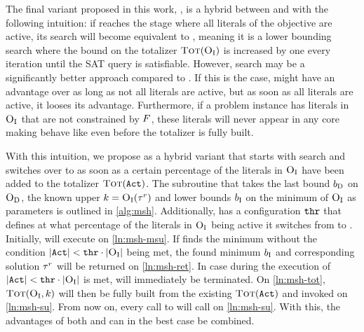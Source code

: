 The final variant proposed in this work, \msh{}, is a hybrid between \msu{} and \satunsat{} with the following intuition:
if \msu{}  reaches the stage where all literals of the objective are active, its search will become equivalent to \unsatsat{}, meaning it is a lower bounding search where the bound on the totalizer $\textsc{Tot}(\textsc{O}_{\text{I}})$ is increased by one every iteration until the SAT query is satisfiable.
However, \satunsat{} search may be a significantly better approach compared to \unsatsat{}.
If this is the case, \msu{} might have an advantage over \satunsat{} as long as not all literals are active, but as soon as all literals are active, it looses its advantage.
Furthermore, if a problem instance has literals in $\textsc{O}_{\text{I}}$ that are not constrained by $F$, these literals will never appear in any core making \msu{} behave like \unsatsat{} even before the totalizer is fully built.

With this intuition, we propose \msh{} as a hybrid variant that starts with \msu{} search and switches over to \satunsat{} as soon as a certain percentage of the literals in $\textsc{O}_{\text{I}}$ have been added to the totalizer $\textsc{Tot}(\texttt{Act})$.
The subroutine that takes the last bound $b_{\text{D}}$ on $\textsc{O}_{\text{D}}$, the known upper $k=\textsc{O}_{\text{I}}(\tau^r)$ and lower bounds $b_{\text{I}}$ on the minimum of $\textsc{O}_{\text{I}}$ as parameters is outlined in \cref{alg:msh}.
Additionally, \msh{} has a configuration $\texttt{thr}$ that defines at what percentage of the literals in $\textsc{O}_{\text{I}}$ being active it switches from \msu{} to \satunsat{}.
Initially, \msh{} will execute \msu{} on \cref{ln:msh-msu}.
If \msu{} finds the minimum without the condition $|\texttt{Act}| < \texttt{thr} \cdot |\textsc{O}_{\text{I}}|$ being met, the found minimum $b_{\text{I}}$ and corresponding solution $\tau^r$ will be returned on \cref{ln:msh-ret}.
In case during the execution of \msu{} $|\texttt{Act}| < \texttt{thr} \cdot |\textsc{O}_{\text{I}}|$ is met, \msu{} will immediately be terminated.
On \cref{ln:msh-tot}, $\textsc{Tot}(\textsc{O}_{\text{I}},k)$ will then be fully built from the existing $\textsc{Tot}(\texttt{Act})$ and \satunsat{} invoked on \cref{ln:msh-su}.
From now on, every call to \msh{} will call \satunsat{} on \cref{ln:msh-su}.
With this, the advantages of both \msu{} and \satunsat{} can in the best case be combined.


